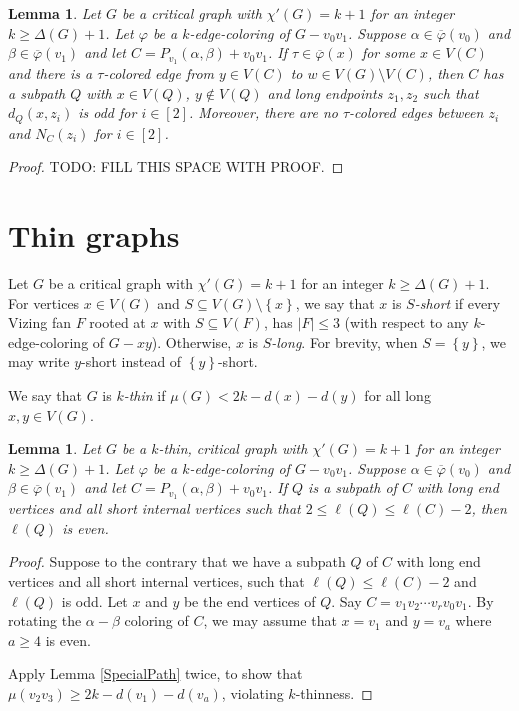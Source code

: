 \documentclass[12pt]{amsart}
\theoremstyle{plain}
\newtheorem{lem}[thm]{Lemma}
\theoremstyle{definition}
\theoremstyle{remark}
\newcommand{\set}[1]{\left\{ #1 \right\}}
\newcommand{\irange}[1]{\left[#1\right]}
\newcommand{\vph}{\varphi}
\newcommand{\vphn}{\overline{\varphi}}
\begin{document}
\begin{lem}\label{TauEscape}
Let $G$ be a critical graph with $\chi'(G) = k+1$ for an integer $k \ge \Delta(G) + 1$.
Let $\vph$ be a $k$-edge-coloring of $G-v_0v_1$. Suppose $\alpha \in \vphn(v_0)$ and $\beta \in \vphn(v_1)$ and let $C = P_{v_1}(\alpha, \beta) + v_0v_1$.
If $\tau \in \vphn(x)$ for some $x \in V(C)$ and there is a $\tau$-colored edge from $y \in V(C)$ to $w \in V(G) \setminus V(C)$, then $C$ has a 
subpath $Q$ with $x \in V(Q)$, $y \not \in V(Q)$ and long endpoints $z_1,z_2$ such that $d_Q(x, z_i)$ is odd for $i \in \irange{2}$.  
Moreover, there are no $\tau$-colored edges between $z_i$ and $N_C(z_i)$ for $i \in \irange{2}$.
\end{lem}
\begin{proof}
TODO: FILL THIS SPACE WITH PROOF.
\end{proof}

\section{Thin graphs}
Let $G$ be a critical graph with $\chi'(G) = k+1$ for an integer $k \ge \Delta(G) + 1$.
For vertices $x \in V(G)$ and $S \subseteq V(G) \setminus \set{x}$, we say that $x$ is \emph{$S$-short} if 
every Vizing fan $F$ rooted at $x$ with $S \subseteq V(F)$, has $|F| \le 3$ (with respect to any $k$-edge-coloring of $G-xy$).
Otherwise, $x$ is \emph{$S$-long}.  For brevity, when $S = \set{y}$, we may write $y$-short instead of $\set{y}$-short.

We say that $G$ is \emph{$k$-thin} if $\mu(G) < 2k - d(x) - d(y)$ for all long $x,y \in V(G)$.

\begin{lem}\label{NonSpecialsInThinAreAtEvenDistance}
Let $G$ be a $k$-thin, critical graph with $\chi'(G) = k+1$ for an integer $k \ge \Delta(G) + 1$.
Let $\vph$ be a $k$-edge-coloring of $G-v_0v_1$. Suppose $\alpha \in \vphn(v_0)$ and $\beta \in \vphn(v_1)$ and let $C = P_{v_1}(\alpha, \beta) + v_0v_1$.
If $Q$ is a subpath of $C$ with long end vertices and all short internal vertices such that $2 \le \ell(Q) \le \ell(C) - 2$, then $\ell(Q)$ is even.
\end{lem}
\begin{proof}
Suppose to the contrary that we have a subpath $Q$ of $C$ with long end vertices and all short internal vertices, such that $\ell(Q) \le \ell(C) - 2$ and $\ell(Q)$ is odd.  Let $x$ and $y$ be the end vertices of $Q$.
Say $C = v_1v_2\cdots v_rv_0v_1$.  By rotating the $\alpha-\beta$ coloring of $C$, we may assume that $x = v_1$ and $y = v_a$ where $a \ge 4$ is even.

Apply Lemma \ref{SpecialPath} twice, to show that $\mu(v_2v_3) \ge 2k - d(v_1) - d(v_a)$, violating $k$-thinness.
\end{proof}
\end{document}
